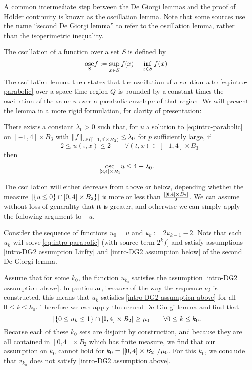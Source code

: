 
A common intermediate step between the De Giorgi lemmas and the proof of H\"{o}lder continuity is known as the oscillation lemma.  Note that some sources use the name ``second De Giorgi lemma'' to refer to the oscillation lemma, rather than the isoperimetric inequality.  

The oscillation of a function over a set $S$ is defined by 
\[ \underset{S}{\operatorname{osc}} f := \sup_{x \in S} f(x) - \inf_{x \in S} f(x). \]
The oscillation lemma then states that the oscillation of a solution $u$ to \eqref{eq:intro-parabolic} over a space-time region $Q$ is bounded by a constant times the oscillation of the same $u$ over a parabolic envelope of that region.  We will present the lemma in a more rigid formulation, for clarity of presentation:
\begin{lemma}
There exists a constant $\lambda_0 > 0$ such that, for $u$ a solution to \eqref{eq:intro-parabolic} on $[-1,4]\times B_3$ with $\left\lVert f\right\rVert_{L^p([-1,4]\times B_3)} \leq \lambda_0$ for $p$ sufficiently large, if
\[ -2 \leq u(t,x) \leq 2 \qquad \forall (t,x) \in [-1,4] \times B_3 \]
then 
\[ \underset{[3,4] \times B_1}{\operatorname{osc}} u \leq 4-\lambda_0. \]
\end{lemma}

The oscillation will either decrease from above or below, depending whether the measure $\left\lvert \{u \leq 0\} \cap [0,4]\times B_2\} \right\rvert$ is more or less than $\frac{\left\lvert [0,4]\times B_2 \right\rvert}{2}$.  We can assume without loss of generality that it is greater, and otherwise we can simply apply the following argument to $-u$.  

Consider the sequence of functions $u_0 = u$ and $u_k := 2u_{k-1} - 2$.  Note that each $u_k$ will solve \eqref{eq:intro-parabolic} (with source term $2^k f$) and satisfy assumptions \eqref{intro-DG2 assumption Linfty} and \eqref{intro-DG2 assumption below} of the second De Giorgi lemma.  

Assume that for some $k_0$, the function $u_{k_0}$ satisfies the assumption \eqref{intro-DG2 assumption above}.  In particular, because of the way the sequence $u_k$ is constructed, this means that $u_k$ satisfies \eqref{intro-DG2 assumption above} for all $0 \leq k \leq k_0$.  Therefore we can apply the second De Giorgi lemma and find that 
\[ \left\lvert \{0 \leq u_k \leq 1\} \cap [0,4] \times B_2 \right\rvert \geq \mu_0 \qquad \forall 0 \leq k \leq k_0. \]
Because each of these $k_0$ sets are disjoint by construction, and because they are all contained in $[0,4]\times B_2$ which has finite measure, we find that our assumption on $k_0$ cannot hold for $k_0 = \left\lvert [0,4]\times B_2 \right\rvert / \mu_0$.  For this $k_0$, we conclude that $u_{k_0}$ does not satisfy \eqref{intro-DG2 assumption above}.  


